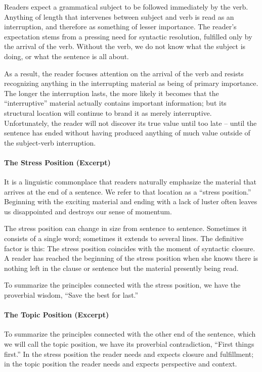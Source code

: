   Readers expect a grammatical subject to be followed immediately by the verb. Anything of length that intervenes between subject and verb is read as an interruption, and therefore as something of lesser importance.
The reader’s expectation stems from a pressing need for syntactic resolution, fulfilled only by the arrival of the verb. Without the verb, we do not know what the subject is doing, or what the sentence is all about.

As a result, the reader focuses attention on the arrival of the verb and resists recognizing anything in the interrupting material as being of primary importance.
The longer the interruption lasts, the more likely it becomes that the “interruptive” material actually contains important information; but its structural location will continue to brand it as merely interruptive.
Unfortunately, the reader will not discover its true value until too late – until the sentence has ended without having produced anything of much value outside of the subject-verb interruption.

\paragraph{The Stress Position (Excerpt)}

It is a linguistic commonplace that readers naturally emphasize the material that arrives at the end of a sentence. We refer to that location as a “stress position.”
Beginning with the exciting material and ending with a lack of luster often leaves us disappointed and destroys our sense of momentum.

The stress position can change in size from sentence to sentence. Sometimes it consists of a single word; sometimes it extends to several lines. The definitive factor is this: The stress position coincides with the moment of syntactic closure. A reader has reached the beginning of the stress position when she knows there is nothing left in the clause or sentence but the material presently being read.

To summarize the principles connected with the stress position, we have the proverbial wisdom, “Save the best for last.”

\paragraph{The Topic Position (Excerpt)}

To summarize the principles connected with the other end of the sentence, which we will call the topic position, we have its proverbial contradiction, “First things first.”
In the stress position the reader needs and expects closure and fulfillment; in the topic position the reader needs and expects perspective and context.

